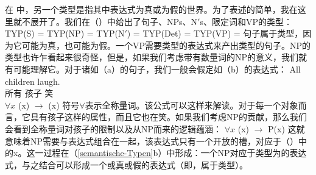 在 中，另一个类型是指其中表达式为真或为假的世界。为了表述的简单，我在这里就不展开了。我们在（）中给出了句子、NPs、N$'$s、限定词和VP的类型：
\eal
\label{semantische-Typen}
\ex TYP(S)   = 
\ex TYP(NP)  = 
\ex TYP(N$'$)  = 
\ex TYP(Det) = 
\ex TYP(VP)  = 
\zl
句子属于类型，因为它可能为真，也可能为假。一个VP需要类型的表达式来产出类型的句子。NP的类型也许乍看起来很奇怪，但是，如果我们考虑带有数量词的NP的意义，我们就有可能理解它。对于诸如（a）的句子，我们一般会假定如（b）的表达式：
\eal
\ex 
\gll All children laugh.\\
所有 孩子 笑\\
\ex $\forall x$ (x) $\to$ (x)
\zl
符号$\forall$表示全称量词。该公式可以这样来解读。对于每一个对象而言，它具有孩子这样的属性，而且它也在笑。如果我们考虑NP的贡献，那么我们会看到全称量词对孩子的限制以及从NP而来的逻辑蕴涵：
\ea
$\forall x$ (x) $\to$ P(x)
\z
这就意味着NP需要与表达式组合在一起，该表达式只有一个开放的槽，对应于（）中的x。这一过程在（\ref{semantische-Typen}b）中形成：一个NP对应于类型为的表达式，与之结合可以形成一个或真或假的表达式（即，属于类型）。

